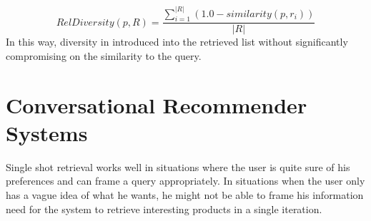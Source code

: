 \begin{equation}
\label{eq:relDiversity}
RelDiversity(p, R)  = \frac{\sum_{i=1}^{\lvert R \rvert} (1.0 - similarity(p, r_i))} {\lvert R \rvert}
\end{equation}
In this way, diversity in introduced into the retrieved list without significantly compromising on the similarity to the query.
%



\section{Conversational Recommender Systems}
Single shot retrieval works well in situations where the user is quite sure of his preferences and can frame a query appropriately.
In situations when the user only has a vague idea of what he wants, he might not be able to frame his information need for the system to retrieve interesting products in a single iteration. 

